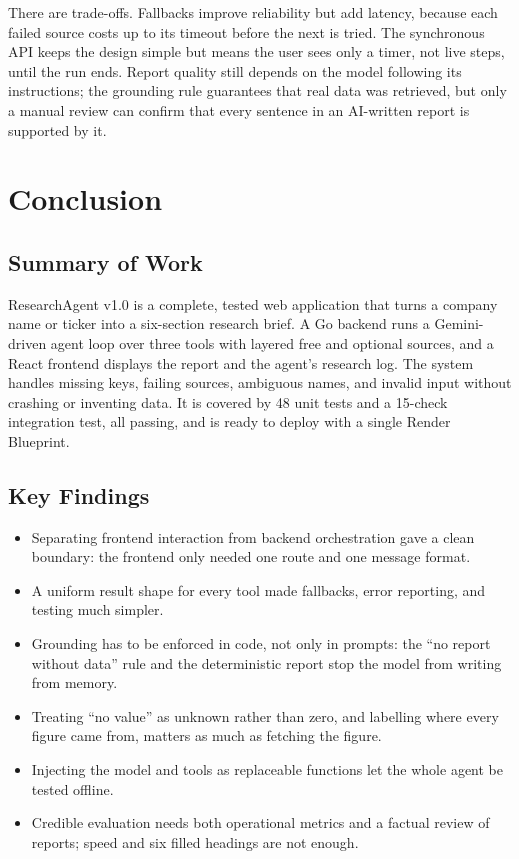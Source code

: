 \documentclass[12pt,a4paper,oneside]{report}
\begin{document}
There are trade-offs. Fallbacks improve reliability but add latency, because each failed source costs up to its timeout before the next is tried. The synchronous API keeps the design simple but means the user sees only a timer, not live steps, until the run ends. Report quality still depends on the model following its instructions; the grounding rule guarantees that real data was retrieved, but only a manual review can confirm that every sentence in an AI-written report is supported by it.

\chapter{Conclusion}
\section{Summary of Work}
ResearchAgent v1.0 is a complete, tested web application that turns a company name or ticker into a six-section research brief. A Go backend runs a Gemini-driven agent loop over three tools with layered free and optional sources, and a React frontend displays the report and the agent's research log. The system handles missing keys, failing sources, ambiguous names, and invalid input without crashing or inventing data. It is covered by 48 unit tests and a 15-check integration test, all passing, and is ready to deploy with a single Render Blueprint.

\section{Key Findings}
\begin{itemize}[leftmargin=*]
\item Separating frontend interaction from backend orchestration gave a clean boundary: the frontend only needed one route and one message format.
\item A uniform result shape for every tool made fallbacks, error reporting, and testing much simpler.
\item Grounding has to be enforced in code, not only in prompts: the ``no report without data'' rule and the deterministic report stop the model from writing from memory.
\item Treating ``no value'' as unknown rather than zero, and labelling where every figure came from, matters as much as fetching the figure.
\item Injecting the model and tools as replaceable functions let the whole agent be tested offline.
\item Credible evaluation needs both operational metrics and a factual review of reports; speed and six filled headings are not enough.
\end{itemize}
\end{document}
